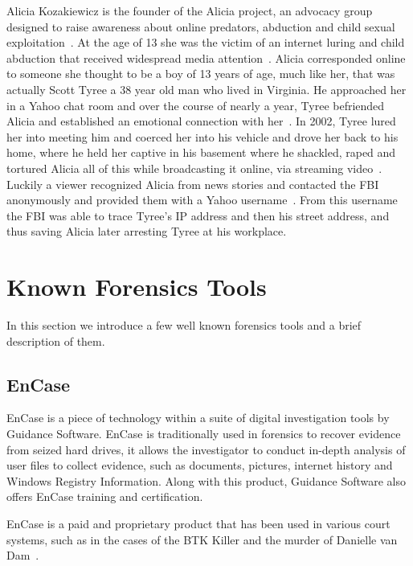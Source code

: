 Alicia Kozakiewicz is the founder of the Alicia project, an advocacy group designed to raise awareness about online predators, abduction and child sexual exploitation~\cite{alicia2013survivor}. At the age of 13 she was the victim of an internet luring and child abduction that received widespread media attention~\cite{nicole2007alicia}. Alicia corresponded online to someone she thought to be a boy of 13 years of age, much like her, that was actually Scott Tyree a 38 year old man who lived in Virginia. He approached her in a Yahoo chat room and over the course of nearly a year, Tyree befriended Alicia and established an emotional connection with her~\cite{nicole2007alicia}. In 2002, Tyree lured her into meeting him and coerced her into his vehicle and drove her back to his home, where he held her captive in his basement where he shackled, raped and tortured Alicia all of this while broadcasting it online, via streaming video~\cite{nicole2007alicia}. Luckily a viewer recognized Alicia from news stories and contacted the FBI anonymously and provided them with a Yahoo username~\cite{alicia2013survivor}. From this username the FBI was able to trace Tyree's IP address and then his street address, and thus saving Alicia later arresting Tyree at his workplace.


\section{Known Forensics Tools}
\label{known}

In this section we introduce a few well known forensics tools and a brief description of them.

\subsection{EnCase}

EnCase is a piece of technology within a suite of digital investigation tools by Guidance Software. EnCase is traditionally used in forensics to recover evidence from seized hard drives, it allows the investigator to conduct in-depth analysis of user files to collect evidence, such as documents, pictures, internet history and Windows Registry Information. Along with this product, Guidance Software also offers EnCase training and certification.

EnCase is a paid and proprietary product that has been used in various court systems, such as in the cases of the BTK Killer and the murder of Danielle van Dam~\cite{taub2006deleting}.

